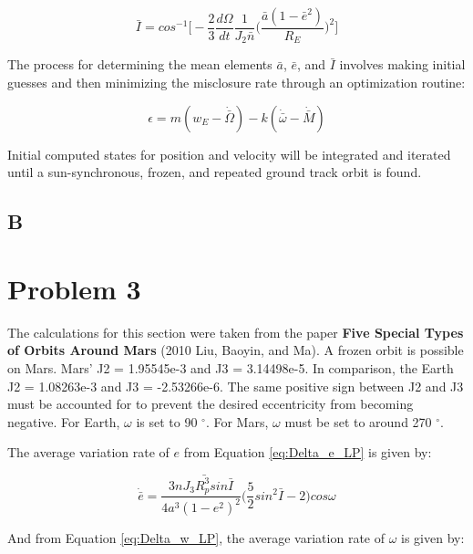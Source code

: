 \documentclass[conf]{new-aiaa}
\begin{document}
\begin{equation}
	\bar{I} = cos^{-1} \Bigg[ -\frac{2}{3} \frac{d \Omega}{dt} \frac{1}{J_2 \bar{n}} \Big( \frac{\bar{a}(1 - \bar{e}^2)}{R_E} \Big)^2 \Bigg]
\end{equation}

The process for determining the mean elements $\bar{a}$, $\bar{e}$, and $\bar{I}$ involves making initial guesses and then minimizing the misclosure rate through an optimization routine: 

\begin{equation}
	\epsilon = m(w_E - \dot{\bar{\Omega}}) - k(\dot{\bar{\omega}} - \dot{\bar{M}})
\end{equation}

Initial computed states for position and velocity will be integrated and iterated until a sun-synchronous, frozen, and repeated ground track orbit is found. 


\subsection*{B}



\section*{Problem 3}

The calculations for this section were taken from the paper \textbf{Five Special Types of Orbits Around Mars} (2010 Liu, Baoyin, and Ma). A frozen orbit is possible on Mars. Mars' J2 = 1.95545e-3 and J3 = 3.14498e-5. In comparison, the Earth J2 = 1.08263e-3 and J3 = -2.53266e-6. The same positive sign between J2 and J3 must be accounted for to prevent the desired eccentricity from becoming negative. For Earth, $\omega$ is set to 90 $^\circ$. For Mars, $\omega$ must be set to around 270 $^\circ$. 

The average variation rate of $e$ from Equation \ref{eq:Delta_e_LP} is given by: 

\begin{equation}
	\dot{\bar{e}} = \frac{3 \bar{n J_3 R_p^3 sin \bar{I}}}{ 4 a^3 ( 1 - e^2 )^2 } \Big( \frac{5}{2} sin^2\bar{I} - 2 \Big) cos \omega
\end{equation}

And from Equation \ref{eq:Delta_w_LP}, the average variation rate of $\omega$ is given by: 
\end{document}
